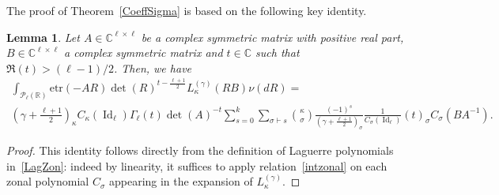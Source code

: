\documentclass[10pt]{amsart}
\newtheorem{lemm}[theo]{Lemma}\newtheorem{prop}[theo]{Proposition}\newtheorem{coro}[theo]{Corollary}\newtheorem{conj}[theo]{Conjecture}
\theoremstyle{definition}\newtheorem{defi}[theo]{Definition}\newtheorem{rema}[theo]{Remark}\newtheorem{exam}[theo]{Example}\newtheorem{exem}[theo]{Example}\newtheorem{nota}[theo]{Notation}
\DeclareMathOperator{\Id}{Id}
\newcommand{\clP}{\mathcal{P}}
\newcommand{\R}{\mathbb{R}}
\newcommand{\C}{\mathbb{C}}
\newcommand{\etr}[1]{\mathrm{etr}\left(#1\right)}
\begin{document}
The proof of Theorem~\ref{CoeffSigma} is based on the following key identity.
\begin{lemm}
Let $A\in \C^{\ell \times \ell}$ be a complex symmetric matrix with positive real part, $B\in \C^{\ell \times \ell}$ a complex symmetric matrix and $t \in \C$ such that $\Re(t)>(\ell-1)/2$. Then, we have
\begin{multline}\label{LaplaceLag}
\int_{\clP_{\ell}(\R)}
\etr{-AR}\det(R)^{t-\frac{\ell+1}{2}}L^{(\gamma)}_{\kappa}(RB) \nu(dR)= \\
\left(\gamma+\frac{\ell+1}{2}\right)_{\kappa} C_{\kappa}(\Id_{\ell})
\Gamma_{\ell}(t) \det(A)^{-t}
\sum_{s=0}^{k} \sum_{ \sigma \vdash s} \binom{\kappa}{\sigma} \frac{(-1)^s}{\left(\gamma+\frac{\ell+1}{2}\right)_{\sigma}}\frac{1}{C_{\sigma}(\Id_{\ell})} (t)_{\sigma} C_{\sigma}\left(BA^{-1}\right). 
\end{multline}
\end{lemm}

\begin{proof}
This identity follows directly from the definition of Laguerre polynomials in~\eqref{LagZon}: indeed by linearity, it suffices to apply relation~\eqref{intzonal} on each zonal polynomial $C_{\sigma}$ appearing in the expansion of $L_{\kappa}^{(\gamma)}$.
\end{proof}
\end{document}
